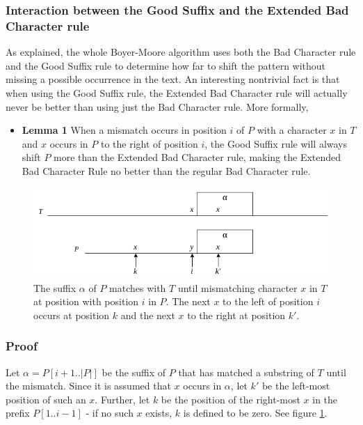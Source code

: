 \subsubsection{Interaction between the Good Suffix and the Extended Bad Character rule}\label{sec:goodsuffixvsbadcharacter}

As explained, the whole Boyer-Moore algorithm uses both the Bad Character rule and the Good Suffix rule to determine how far to shift the pattern without missing a possible occurrence in the text. An interesting nontrivial fact is that when using the Good Suffix rule, the Extended Bad Character rule will actually never be better than using just the Bad Character rule. More formally,

\begin{itemize}
    \item[] \textbf{Lemma 1} When a mismatch occurs in position $i$ of $P$ with a character $x$ in $T$ and $x$ occurs in $P$ to the right of position $i$, the Good Suffix rule will always shift $P$ more than the Extended Bad Character rule, making the Extended Bad Character Rule no better than the regular Bad Character rule. 
\end{itemize}

\begin{figure}[t]
    \centering
    \includegraphics[width=\textwidth]{LaTeX/Figures/Zalg/suffixvsbadchar.png}
    \caption{The suffix $\alpha$ of $P$ matches with $T$ until mismatching character $x$ in $T$ at position with position $i$ in $P$. The next $x$ to the left of position $i$ occurs at position $k$ and the next $x$ to the right at position $k'$.}
    \label{fig:suffixvsbadchar}
\end{figure}

\subsubsection{Proof}

Let $\alpha=P[i+1..|P|]$ be the suffix of $P$ that has matched a substring of $T$ until the mismatch. Since it is assumed that $x$ occurs in $\alpha$, let $k'$ be the left-most position of such an $x$. Further, let $k$ be the position of the right-most $x$ in the prefix $P[1..i-1]$ - if no such $x$ exists, $k$ is defined to be zero. See figure \ref{fig:suffixvsbadchar}. 

